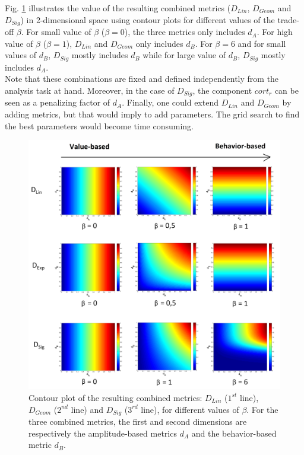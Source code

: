 Fig. \ref{fig:ContourLine} illustrates the value of the resulting combined metrics ($D_{Lin}$, $D_{Geom}$ and $D_{Sig}$) in 2-dimensional space using contour plots for different values of the trade-off $\beta$. For small value of $\beta$ ($\beta=0$), the three metrics only includes $d_A$. For high value of $\beta$ ($\beta=1$), $D_{Lin}$ and $D_{Geom}$ only includes $d_B$. For $\beta=6$ and for small values of $d_B$, $D_{Sig}$ mostly includes $d_B$ while for large value of $d_B$, $D_{Sig}$ mostly includes $d_A$. \\
Note that these combinations are fixed and defined independently from the analysis task at hand. Moreover, in the case of $D_{Sig}$, 
the component $cort_r$ can be seen as a penalizing factor of $d_A$. Finally, one could extend $D_{Lin}$ and $D_{Geom}$ by adding metrics, but that would imply to add parameters. The grid search to find the best parameters would become time consuming.

\begin{figure}[h!]
	\centering
	\includegraphics[width=1\linewidth]{images/CombinedMetrics}
	\caption[Contour plot of the resulting combined metrics: $D_{Lin}$ ($1^{st}$ line), $D_{Geom}$ ($2^{nd}$ line) and $D_{Sig}$ ($3^{rd}$ line), for different values of $\beta$.]{Contour plot of the resulting combined metrics: $D_{Lin}$ ($1^{st}$ line), $D_{Geom}$ ($2^{nd}$ line) and $D_{Sig}$ ($3^{rd}$ line), for different values of $\beta$. For the three combined metrics, the first and second dimensions are respectively the amplitude-based metrics $d_A$ and the behavior-based metric $d_B$.}
	\label{fig:ContourLine}
\end{figure}

